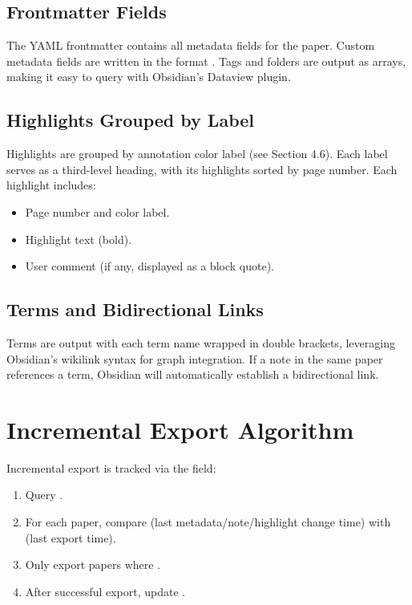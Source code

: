 \subsection{Frontmatter Fields}

The YAML frontmatter contains all metadata fields for the paper. Custom metadata fields
are written in the format . Tags and folders are output as
arrays, making it easy to query with Obsidian's Dataview plugin.

\subsection{Highlights Grouped by Label}

Highlights are grouped by annotation color label (see Section 4.6). Each label serves as
a third-level heading, with its highlights sorted by page number. Each highlight includes:

\begin{itemize}
  \item Page number and color label.
  \item Highlight text (bold).
  \item User comment (if any, displayed as a block quote).
\end{itemize}

\subsection{Terms and Bidirectional Links}

Terms are output with each term name wrapped in  double brackets,
leveraging Obsidian's wikilink syntax for graph integration. If a note in the same paper
references a term, Obsidian will automatically establish a bidirectional link.

\section{Incremental Export Algorithm}

Incremental export is tracked via the  field:

\begin{enumerate}
  \item Query .
  \item For each paper, compare  (last metadata/note/highlight change time)
    with  (last export time).
  \item Only export papers where .
  \item After successful export, update .
\end{enumerate}

